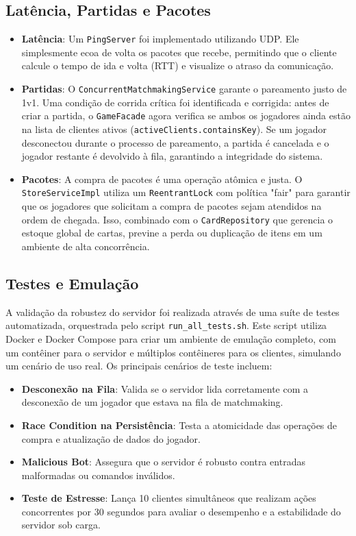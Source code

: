 \documentclass[12pt,a4paper]{article}
\begin{document}
\subsection{Latência, Partidas e Pacotes}
\begin{itemize}
    \item \textbf{Latência}: Um \texttt{PingServer} foi implementado utilizando UDP. Ele simplesmente ecoa de volta os pacotes que recebe, permitindo que o cliente calcule o tempo de ida e volta (RTT) e visualize o atraso da comunicação.
    \item \textbf{Partidas}: O \texttt{ConcurrentMatchmakingService} garante o pareamento justo de 1v1. Uma condição de corrida crítica foi identificada e corrigida: antes de criar a partida, o \texttt{GameFacade} agora verifica se ambos os jogadores ainda estão na lista de clientes ativos (\texttt{activeClients.containsKey}). Se um jogador desconectou durante o processo de pareamento, a partida é cancelada e o jogador restante é devolvido à fila, garantindo a integridade do sistema.
    \item \textbf{Pacotes}: A compra de pacotes é uma operação atômica e justa. O \texttt{StoreServiceImpl} utiliza um \texttt{ReentrantLock} com política "fair" para garantir que os jogadores que solicitam a compra de pacotes sejam atendidos na ordem de chegada. Isso, combinado com o \texttt{CardRepository} que gerencia o estoque global de cartas, previne a perda ou duplicação de itens em um ambiente de alta concorrência.
\end{itemize}

\subsection{Testes e Emulação}
A validação da robustez do servidor foi realizada através de uma suíte de testes automatizada, orquestrada pelo script \texttt{run\_all\_tests.sh}. Este script utiliza Docker e Docker Compose para criar um ambiente de emulação completo, com um contêiner para o servidor e múltiplos contêineres para os clientes, simulando um cenário de uso real. Os principais cenários de teste incluem:
\begin{itemize}
    \item \textbf{Desconexão na Fila}: Valida se o servidor lida corretamente com a desconexão de um jogador que estava na fila de matchmaking.
    \item \textbf{Race Condition na Persistência}: Testa a atomicidade das operações de compra e atualização de dados do jogador.
    \item \textbf{Malicious Bot}: Assegura que o servidor é robusto contra entradas malformadas ou comandos inválidos.
    \item \textbf{Teste de Estresse}: Lança 10 clientes simultâneos que realizam ações concorrentes por 30 segundos para avaliar o desempenho e a estabilidade do servidor sob carga.
\end{itemize}
\end{document}
